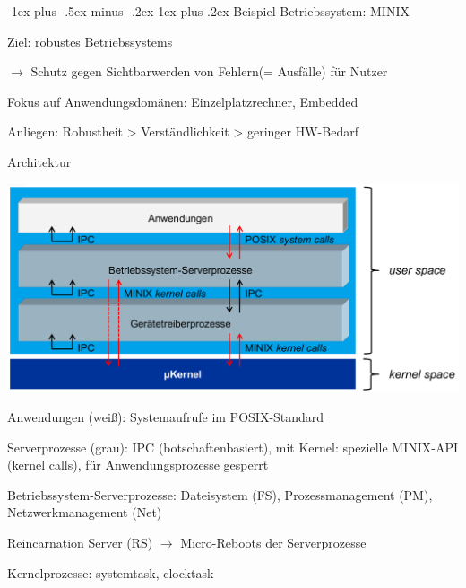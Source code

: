 \documentclass[a4paper]{article}
\makeatletter
\renewcommand{\subsubsection}{\@startsection{subsubsection}{3}{0mm}%
 {-1ex plus -.5ex minus -.2ex}%
 {1ex plus .2ex}%
 {\normalfont\small\bfseries}}
\makeatother
\begin{document}
\begin{multicols}{3}

    \subsubsection{Beispiel-Betriebssystem: MINIX}
    \begin{itemize*}
        \item Ziel: robustes Betriebssystems
        \item[$\rightarrow$] Schutz gegen Sichtbarwerden von Fehlern(= Ausfälle) für Nutzer
        \item Fokus auf Anwendungsdomänen: Einzelplatzrechner, Embedded
        \item Anliegen: Robustheit \textgreater{} Verständlichkeit \textgreater{} geringer HW-Bedarf
    \end{itemize*}

    Architektur
    \begin{itemize*}
        \item \includegraphics[width=.7\linewidth]{Assets/AdvancedOperatingSystems-minix-architektur.png}
        \item Anwendungen (weiß): Systemaufrufe im POSIX-Standard
        \item Serverprozesse (grau): IPC (botschaftenbasiert), mit Kernel: spezielle MINIX-API (kernel calls), für Anwendungsprozesse gesperrt
        \item Betriebssystem-Serverprozesse: Dateisystem (FS), Prozessmanagement (PM), Netzwerkmanagement (Net)
        \item Reincarnation Server (RS) $\rightarrow$ Micro-Reboots der Serverprozesse
        \item Kernelprozesse: systemtask, clocktask
    \end{itemize*}


\end{multicols}
\end{document}

